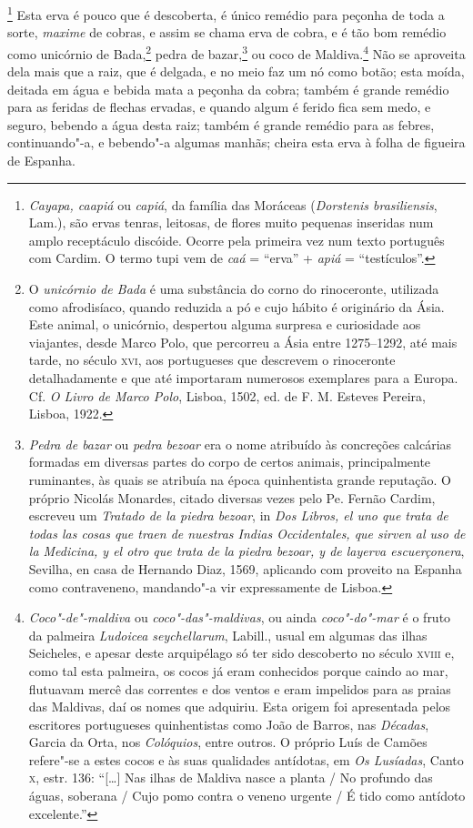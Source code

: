 \footnote{ \textit{Cayapa, caapiá} ou \textit{capiá},
da família das Moráceas (\textit{Dorstenis brasiliensis}, Lam.), são
ervas tenras, leitosas, de flores muito pequenas inseridas num amplo
receptáculo discóide. Ocorre pela primeira vez num texto português com
Cardim. O termo tupi vem de \textit{caá} = ``erva'' + \textit{apiá} = ``testículos''.} 
Esta erva é pouco que é descoberta, é único
remédio para peçonha de toda a sorte, \textit{maxime} de cobras, e assim se chama
erva de cobra, e é tão bom remédio como unicórnio de Bada,\footnote{ O
\textit{unicórnio de Bada} é uma substância do corno do rinoceronte,
utilizada como afrodisíaco, quando reduzida a pó e cujo hábito é
originário da Ásia. Este animal, o unicórnio, despertou alguma surpresa
e curiosidade aos viajantes, desde Marco Polo, que percorreu a Ásia
entre 1275--1292, até mais tarde, no século \textsc{xvi}, aos portugueses que
descrevem o rinoceronte detalhadamente e que até importaram numerosos
exemplares para a Europa. Cf. \textit{O Livro de Marco Polo}, Lisboa,
1502, ed. de F. M. Esteves Pereira, Lisboa, 1922.} pedra de 
bazar,\footnote{ \textit{Pedra de bazar} ou \textit{pedra bezoar} era o
nome atribuído às concreções calcárias formadas em diversas partes
do corpo de certos animais, principalmente ruminantes, às quais se
atribuía na época quinhentista grande reputação. O próprio Nicolás
Monardes, citado diversas vezes pelo Pe. Fernão Cardim, escreveu um
\textit{Tratado de la piedra bezoar}, in \textit{Dos Libros, el uno que
trata de todas las cosas que traen de nuestras Indias Occidentales,
que sirven al uso de la Medicina, y el otro que trata de la piedra
bezoar, y de layerva escuerçonera}, Sevilha, en casa de Hernando Diaz,
1569, aplicando com proveito na Espanha como contraveneno,
mandando"-a vir expressamente de Lisboa.} ou coco de 
Maldiva.\footnote{ \textit{Coco"-de"-maldiva} 
ou \textit{coco"-das"-maldivas}, ou ainda
\textit{coco"-do"-mar} é o fruto da palmeira \textit{Ludoicea
seychellarum}, Labill., usual em algumas das ilhas Seicheles, e apesar
deste arquipélago só ter sido descoberto no século \textsc{xviii} e, como tal
esta palmeira, os cocos já eram conhecidos porque caindo ao mar,
flutuavam mercê das correntes e dos ventos e eram impelidos para as
praias das Maldivas, daí os nomes que adquiriu. Esta origem foi
apresentada pelos escritores portugueses quinhentistas como João de
Barros, nas \textit{Décadas}, Garcia da Orta, nos \textit{Colóquios}, 
entre outros. O próprio Luís de Camões refere"-se a estes cocos e às
suas qualidades antídotas, em \textit{Os Lusíadas}, Canto \textsc{x}, estr. 136:
 ``[\ldots{}] Nas ilhas de Maldiva nasce a planta / No profundo das águas,
soberana / Cujo pomo contra o veneno urgente / É tido como antídoto
excelente.''} Não se aproveita dela mais que a raiz, que é delgada, e no
meio faz um nó como botão; esta moída, deitada em água e bebida mata a
peçonha da cobra; também é grande remédio para as feridas de flechas
ervadas, e quando algum é ferido fica sem medo, e seguro, bebendo a
água desta raiz; também é grande remédio para as febres, continuando"-a,
e bebendo"-a algumas manhãs; cheira esta erva à folha de figueira de Espanha.

